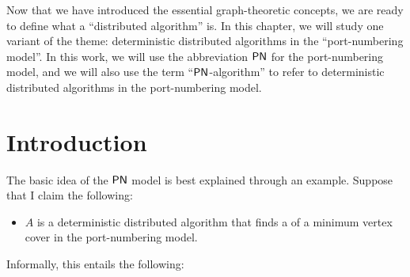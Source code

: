 
Now that we have introduced the essential graph-theoretic concepts, we are ready to define what a ``distributed algorithm'' is. In this chapter, we will study one variant of the theme: deterministic distributed algorithms in the ``port-numbering model''. In this work, we will use the abbreviation $\textsf{PN}$ for the port-numbering model, and we will also use the term ``$\textsf{PN}$-algorithm'' to refer to deterministic distributed algorithms in the port-numbering model.

\section{Introduction}

The basic idea of the $\textsf{PN}$ model is best explained through an example. Suppose that I claim the following:
\begin{itemize}
    \item $A$ is a deterministic distributed algorithm that finds a  of a minimum vertex cover in the port-numbering model.
\end{itemize}
Informally, this entails the following:
